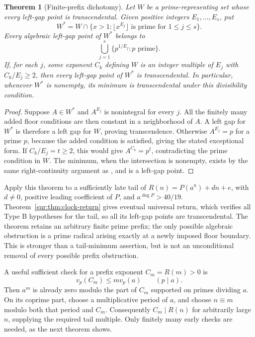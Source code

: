 \documentclass[11pt,a4paper]{article}
\newtheorem{theorem}{Theorem}[section]
\theoremstyle{definition}
\theoremstyle{remark}
\numberwithin{equation}{section}
\begin{document}
\begin{theorem}[Finite-prefix dichotomy]\label{mil:thm:finite-prefix}
Let $W$ be a prime-representing set whose every left-gap point is
transcendental. Given positive integers $E_1,\ldots,E_s$, put
\[
 W^*=W\cap\{x>1:\lfloor x^{E_j}\rfloor\text{ is prime for }1\le j\le s\}.
\]
Every algebraic left-gap point of $W^*$ belongs to
\[
 \bigcup_{j=1}^s\{p^{1/E_j}:p\text{ prime}\}.
\]
If, for each $j$, some exponent $C_k$ defining $W$ is an integer
multiple of $E_j$ with $C_k/E_j\ge2$, then every left-gap point of
$W^*$ is transcendental. In particular, whenever $W^*$ is nonempty,
its minimum is transcendental under this divisibility condition.
\end{theorem}
\begin{proof}
Suppose $A\in W^*$ and $A^{E_j}$ is nonintegral for every $j$.
All the finitely many added floor conditions are then constant in a
neighborhood of $A$. A left gap for $W^*$ is therefore a left gap for
$W$, proving transcendence. Otherwise $A^{E_j}=p$ for a prime $p$,
because the added condition is satisfied, giving the stated exceptional
form. If $C_k/E_j=t\ge2$, this would give $A^{C_k}=p^t$, contradicting
the prime condition in $W$. The minimum, when the intersection is
nonempty, exists by the same right-continuity argument as
\cite[Lemma~4.1]{SaitoVariants}, and is a left-gap point.
\end{proof}

Apply this theorem to a sufficiently late tail of
$R(n)=P(a^n)+dn+e$, with $d\ne0$, positive leading coefficient of $P$,
and $a^{\deg P}>40/19$. Theorem~\ref{sur:thm:clock-return} gives eventual universal return, which
verifies all Type B hypotheses for the tail, so all its left-gap points are
transcendental. The theorem retains an arbitrary finite prime prefix;
the only possible algebraic obstruction is a prime radical arising
exactly at a newly imposed floor boundary. This is stronger than a
tail-minimum assertion, but is not an unconditional removal of every
possible prefix obstruction.

A useful sufficient check for a prefix exponent $C_m=R(m)>0$ is
\begin{equation}\label{mil:eq:prefix-bad-prime-check}
 v_p(C_m)\le m v_p(a)\qquad(p\mid a).
\end{equation}
Then $a^m$ is already zero modulo the part of $C_m$ supported on primes
dividing $a$. On its coprime part, choose a multiplicative period of
$a$, and choose $n\equiv m$ modulo both that period and $C_m$.
Consequently $C_m\mid R(n)$ for arbitrarily large $n$, supplying the
required tail multiple. Only finitely many early checks are needed,
as the next theorem shows.
\end{document}
